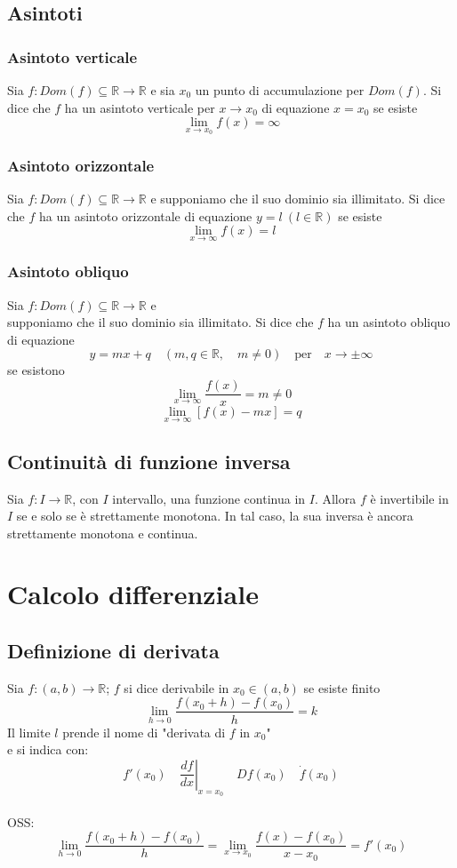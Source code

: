 \documentclass[12pt]{article}
\begin{document}
\subsection{Asintoti}
\subsubsection{Asintoto verticale}
Sia $f: Dom(f) \subseteq \mathbb{R} \to \mathbb{R}$ e sia
$x_0$ un punto di accumulazione per $Dom(f)$.
Si dice che $f$ ha un asintoto verticale
per $x \to x_0$ di equazione $x = x_0$
se esiste \[ \lim_{x \to x_0} f(x) = \infty\]

\subsubsection{Asintoto orizzontale}
Sia $f: Dom(f) \subseteq \mathbb{R} \to \mathbb{R}$ e
supponiamo che il suo dominio sia illimitato.
Si dice che $f$ ha un asintoto orizzontale
di equazione $y = l\ (l \in \mathbb{R})$
se esiste \[ \lim_{x \to \infty} f(x) = l\]
\subsubsection{Asintoto obliquo}
Sia $f: Dom(f) \subseteq \mathbb{R} \to \mathbb{R}$ e\\
supponiamo che il suo dominio sia illimitato.
Si dice che $f$ ha un asintoto obliquo
di equazione
\[ y = mx+q \quad (m, q \in \mathbb{R}, \quad m \neq 0)\quad \text{per} \quad  x \to \pm \infty \]
se esistono
\[ \lim_{x \to \infty} \frac{f(x)}{x} = m \neq 0 \]
\[ \lim_{x \to \infty} [f(x) - mx] = q \]

\subsection{Continuità di funzione inversa}
Sia $f: I \to \mathbb{R}$, con $I$ intervallo,
una funzione continua in $I$. Allora $f$ è invertibile
in $I$ se e solo se è strettamente monotona.
In tal caso, la sua inversa è ancora strettamente
monotona e continua.

\section{Calcolo differenziale}

\subsection{Definizione di derivata}
Sia $f: (a,b) \to \mathbb{R}$; $f$ si dice
derivabile in $x_0 \in (a,b)$ se esiste finito
\[ \lim_{h \to 0} \frac{f(x_0 +h) - f(x_0)}{h}=k\]
Il limite $l$ prende il nome di "derivata di $f$ in $x_0$"\\
e si indica con:
\[ f'(x_0) \quad \left. \frac{df}{dx} \right |_{x = x_0} \quad  Df(x_0) \quad \dot{f}(x_0) \]
\\
OSS:
\[ \lim_{h \to 0} \frac{f(x_0 +h) - f(x_0)}{h} = \lim_{x \to x_0} \frac{f(x) - f(x_0)}{x - x_0} = f'(x_0)\]
\end{document}
